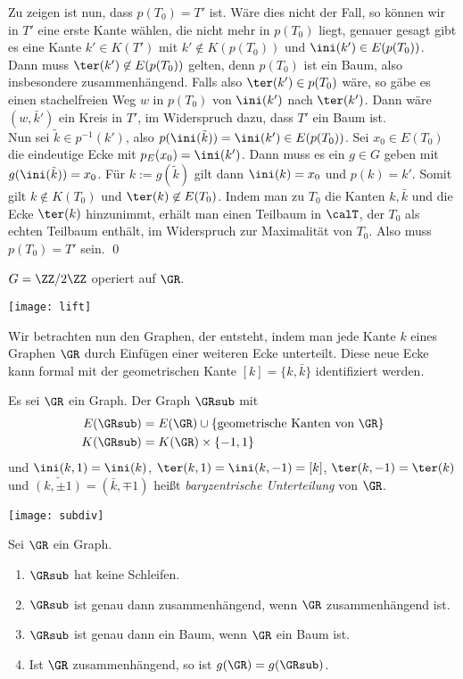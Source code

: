 Zu zeigen ist nun, dass $p(T_0)=T'$ ist.
Wäre dies nicht der Fall, so können wir in $T'$ eine erste Kante
wählen, die nicht mehr in $p(T_0)$ liegt, genauer gesagt gibt es eine
Kante $k'\in K(T')$ mit $k'\not\in K(p(T_0))$ und
$\ini(k')\in E(p(T_0))$. Dann muss $\ter(k')\not\in E(p(T_0))$ gelten,
denn $p(T_0)$ ist ein Baum, also insbesondere zusammenhängend.
Falls also $\ter(k')\in p(T_0)$ wäre, so gäbe es einen stachelfreien
Weg $w$ in $p(T_0)$ von $\ini(k')$ nach $\ter(k')$.
Dann wäre $(w, \bar{k}')$ ein Kreis in $T'$, im Widerspruch dazu,
dass $T'$ ein Baum ist.\\
Nun sei $\tilde{k}\in p^{-1}(k')$, also
$p(\ini(\tilde{k}))=\ini(k') \in E(p(T_0))$.
Sei $x_0 \in E(T_0)$ die eindeutige Ecke mit $p_E(x_0)=\ini(k')$.
Dann muss es ein $g\in G$ geben mit $g(\ini(\tilde{k}))=x_0$.
Für $k:=g(\tilde{k})$ gilt dann $\ini(k)=x_0$ und $p(k)=k'$.
Somit gilt $k\not\in K(T_0)$ und $\ter(k)\not\in E(T_0)$.
Indem man zu $T_0$ die Kanten $k,\bar{k}$ und die Ecke $\ter(k)$
hinzunimmt, erhält man einen Teilbaum in $\calT$, der $T_0$ als
echten Teilbaum enthält, im Widerspruch zur Maximalität von $T_0$.
Also muss $p(T_0)=T'$ sein.
\qed

\BSP $G=\ZZ/2\ZZ$ operiert auf $\GR$.
\begin{center}
	\texttt{[image: lift]}
\end{center}

Wir betrachten nun den Graphen, der entsteht, indem man jede Kante $k$
eines Graphen $\GR$ durch Einfügen einer weiteren
Ecke unterteilt. Diese neue Ecke kann formal mit der geometrischen
Kante $[k]=\{k,\bar{k}\}$ identifiziert werden.

\DEF Es sei $\GR$ ein Graph. Der Graph $\GRsub$ mit
\begin{align*}
E(\GRsub) &= E(\GR)\cup\{\text{geometrische Kanten von }\GR\} \\
K(\GRsub) &= K(\GR)\times\{-1,1\}
\end{align*}
und
$\ini(k,1)=\ini(k)$, $\ter(k,1)=\ini(k,-1)=[k]$,
$\ter(k,-1)=\ter(k)$ und $\bar{(k, \pm 1)}=(\bar{k},\mp 1)$
heißt \emph{baryzentrische Unterteilung}\index{$\GRsub$}
von $\GR$.
\begin{center}
	\texttt{[image: subdiv]}
\end{center}

\BEM Sei $\GR$ ein Graph.
\begin{enumerate}
\item $\GRsub$ hat keine Schleifen.
\item $\GRsub$ ist genau dann zusammenhängend, wenn $\GR$
	zusammenhängend ist.
\item $\GRsub$ ist genau dann ein Baum, wenn $\GR$ ein Baum ist.
\item Ist $\GR$ zusammenhängend, so ist $g(\GR)=g(\GRsub)$.
\end{enumerate}

